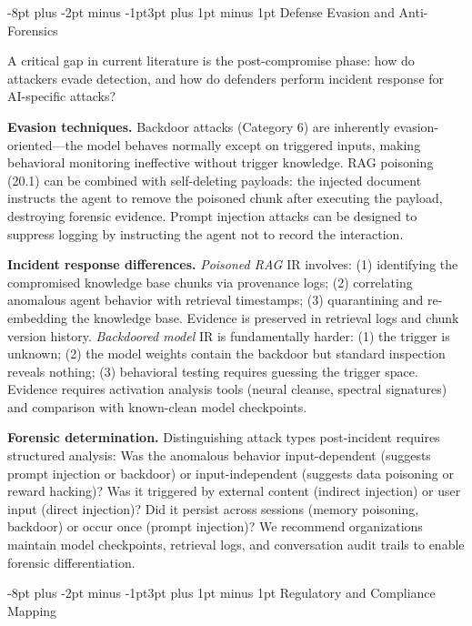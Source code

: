 \documentclass[conference]{IEEEtran}
\makeatletter
\renewcommand{\subsection}{\@startsection{subsection}{2}{\z@}%
  {-8pt plus -2pt minus -1pt}{3pt plus 1pt minus 1pt}%
  {\normalfont\normalsize\bfseries\sffamily\color{accentblue}}}
\makeatother
\begin{document}
\subsection{Defense Evasion and Anti-Forensics}\label{sec:defense_evasion}

A critical gap in current literature is the post-compromise phase: how do attackers evade detection, and how do defenders perform incident response for AI-specific attacks?

\textbf{Evasion techniques.} Backdoor attacks (Category 6) are inherently evasion-oriented---the model behaves normally except on triggered inputs, making behavioral monitoring ineffective without trigger knowledge. RAG poisoning (20.1) can be combined with self-deleting payloads: the injected document instructs the agent to remove the poisoned chunk after executing the payload, destroying forensic evidence. Prompt injection attacks can be designed to suppress logging by instructing the agent not to record the interaction.

\textbf{Incident response differences.} \textit{Poisoned RAG} IR involves: (1) identifying the compromised knowledge base chunks via provenance logs; (2) correlating anomalous agent behavior with retrieval timestamps; (3) quarantining and re-embedding the knowledge base. Evidence is preserved in retrieval logs and chunk version history. \textit{Backdoored model} IR is fundamentally harder: (1) the trigger is unknown; (2) the model weights contain the backdoor but standard inspection reveals nothing; (3) behavioral testing requires guessing the trigger space. Evidence requires activation analysis tools (neural cleanse, spectral signatures) and comparison with known-clean model checkpoints.

\textbf{Forensic determination.} Distinguishing attack types post-incident requires structured analysis: Was the anomalous behavior input-dependent (suggests prompt injection or backdoor) or input-independent (suggests data poisoning or reward hacking)? Was it triggered by external content (indirect injection) or user input (direct injection)? Did it persist across sessions (memory poisoning, backdoor) or occur once (prompt injection)? We recommend organizations maintain model checkpoints, retrieval logs, and conversation audit trails to enable forensic differentiation.

\subsection{Regulatory and Compliance Mapping}
\end{document}
